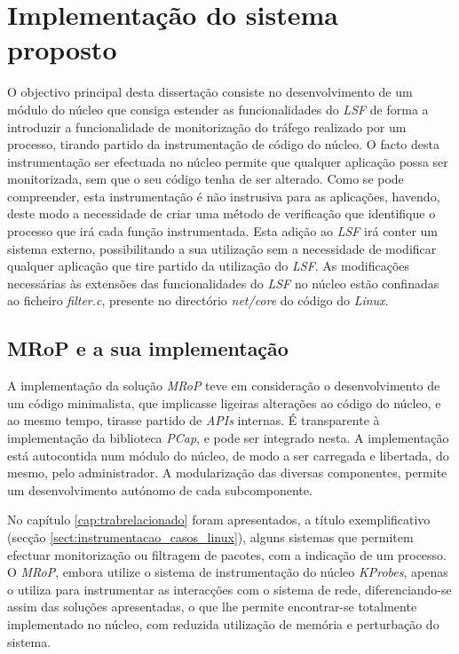 \chapter{Implementação do sistema proposto}
\label{cap:Implementacao}




O objectivo principal desta dissertação consiste no desenvolvimento de um módulo do núcleo que consiga estender as funcionalidades do \textit{LSF} de forma a introduzir a funcionalidade de monitorização do tráfego realizado por um processo, tirando partido da instrumentação de código do núcleo.
O facto desta instrumentação ser efectuada no núcleo permite que qualquer aplicação possa ser monitorizada, sem que o seu código tenha de ser alterado.
Como se pode compreender, esta instrumentação é não instrusiva para as aplicações, havendo, deste modo a necessidade de criar uma método de verificação que identifique o processo que irá cada função instrumentada.
Esta adição ao \textit{LSF} irá conter um sistema externo, possibilitando a sua utilização sem a necessidade de modificar qualquer aplicação que tire partido da utilização do \textit{LSF}.
As modificações necessárias às extensões das funcionalidades do \textit{LSF} no núcleo estão confinadas ao ficheiro \textit{filter.c}, presente no directório \textit{net/core} do código do \textit{Linux}.

\section{MRoP e a sua implementação}
\label{sec:mrop_implementation}

A implementação da solução \textit{MRoP} teve em consideração o desenvolvimento de um código minimalista, que implicasse ligeiras alterações ao código do núcleo, e ao mesmo tempo, tirasse partido de \textit{APIs} internas.
É transparente à implementação da biblioteca \textit{PCap}, e pode ser integrado nesta.
A implementação está autocontida num módulo do núcleo, de modo a ser carregada e libertada, do mesmo, pelo administrador.
A modularização das diversas componentes, permite um desenvolvimento autónomo de cada subcomponente.

No capítulo \ref{cap:trabrelacionado} foram apresentados, a título exemplificativo (secção \ref{sect:instrumentacao_casos_linux}), alguns sistemas que permitem efectuar monitorização ou filtragem de pacotes, com a indicação de um processo.
O \textit{MRoP}, embora utilize o sistema de instrumentação do núcleo \textit{KProbes}, apenas o utiliza para instrumentar as interacções com o sistema de rede, diferenciando-se assim das soluções apresentadas, o que lhe permite encontrar-se totalmente implementado no núcleo, com reduzida utilização de memória e perturbação do sistema.

